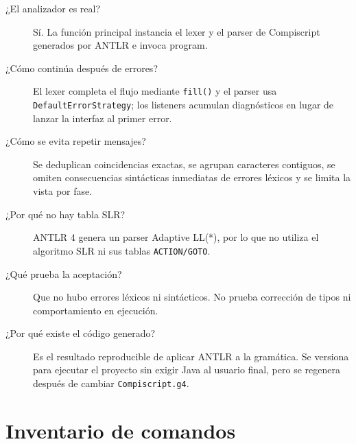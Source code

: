 \documentclass[12pt,letterpaper,oneside]{report}
\newcommand{\archivo}[1]{\texttt{#1}}
\newcommand{\regla}[1]{\textsf{#1}}
\begin{document}
\begin{description}
  \item[¿El analizador es real?] Sí. La función principal instancia el lexer y el
  parser de Compiscript generados por ANTLR e invoca \regla{program}.

  \item[¿Cómo continúa después de errores?] El lexer completa el flujo mediante
  \archivo{fill()} y el parser usa \archivo{DefaultErrorStrategy}; los listeners
  acumulan diagnósticos en lugar de lanzar la interfaz al primer error.

  \item[¿Cómo se evita repetir mensajes?] Se deduplican coincidencias exactas, se
  agrupan caracteres contiguos, se omiten consecuencias sintácticas inmediatas de
  errores léxicos y se limita la vista por fase.

  \item[¿Por qué no hay tabla SLR?] ANTLR 4 genera un parser Adaptive LL(*), por lo
  que no utiliza el algoritmo SLR ni sus tablas \archivo{ACTION/GOTO}.

  \item[¿Qué prueba la aceptación?] Que no hubo errores léxicos ni sintácticos. No
  prueba corrección de tipos ni comportamiento en ejecución.

  \item[¿Por qué existe el código generado?] Es el resultado reproducible de aplicar
  ANTLR a la gramática. Se versiona para ejecutar el proyecto sin exigir Java al
  usuario final, pero se regenera después de cambiar \archivo{Compiscript.g4}.
\end{description}

\chapter{Inventario de comandos}
\end{document}
